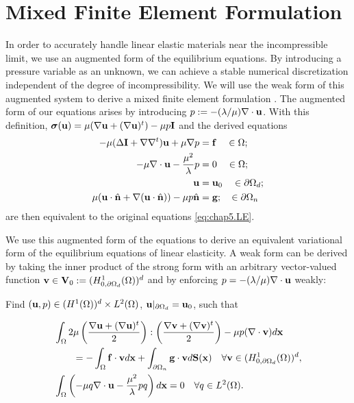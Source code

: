 \section{Mixed Finite Element Formulation} \label{sec:chap5.mixedfem}

In order to accurately handle linear elastic materials near the incompressible limit, we use an augmented form of the equilibrium equations. By introducing a pressure variable as an unknown, we can achieve a stable numerical discretization independent of the degree of incompressibility. We will use the weak form of this augmented system to derive a mixed finite element formulation \cite{Brezzi91}. The augmented form of our equations arises by introducing $p := -(\lambda/\mu) \nabla \cdot \mathbf{u}$. With this definition, $\boldsymbol{\sigma}(\mathbf{u}) = \mu (\nabla \mathbf{u} + (\nabla \mathbf{u})^t) - \mu p \mathbf{I}$ and the derived equations
\begin{subequations} \label{eq:chap5.augmented.strong}
\begin{align}
-\mu (\Delta \mathbf{I} + \nabla \nabla^t) \mathbf{u} + \mu \nabla p & = \mathbf{f} \quad \in \Omega; \label{eq:chap5.augmented.strong.PDE} \\
-\mu \nabla \cdot \mathbf{u} - \frac{\mu^2}{\lambda} p & = 0 \quad \in \Omega; \\
\mathbf{u} & = \mathbf{u}_0 \quad \in \partial\Omega_d; \\
\mu (\mathbf{u} \cdot \hat{\mathbf{n}} + \nabla (\mathbf{u} \cdot \hat{\mathbf{n}})) - \mu p \hat{\mathbf{n}} & = \mathbf{g}; \quad \in \partial\Omega_n
\end{align}
\end{subequations}
are then equivalent to the original equations \eqref{eq:chap5.LE}.

We use this augmented form of the equations to derive an equivalent variational form of the equilibrium equations of linear elasticity. A weak form can be derived by taking the inner product of the strong form with an arbitrary vector-valued function $\mathbf{v} \in \mathbf{V}_0 := (H_{0,\partial\Omega_d}^1(\Omega))^d$ and by enforcing $p = -(\lambda/\mu) \nabla \cdot \mathbf{u}$ weakly:
\begin{center}
Find $(\mathbf{u},p) \in (H^1(\Omega))^d \times L^2(\Omega)$, $\mathbf{u} \rvert_{\partial\Omega_d} = \mathbf{u}_0$, such that
\end{center}
\begin{subequations} \label{eq:chap5.augmented.weak}
\begin{align}
& \int_{\Omega} 2 \mu \left( \frac{\nabla \mathbf{u} + (\nabla \mathbf{u})^t}{2} \right) : \left( \frac{\nabla \mathbf{v} + (\nabla \mathbf{v})^t}{2} \right) - \mu p (\nabla \cdot \mathbf{v}) d\mathbf{x} \\
& \qquad = -\int_{\Omega} \mathbf{f} \cdot \mathbf{v} d\mathbf{x} + \int_{\partial\Omega_n} \mathbf{g} \cdot \mathbf{v} d\mathbf{S}(\mathbf{x}) \quad \forall \mathbf{v} \in (H^1_{0,\partial\Omega_d}(\Omega))^d, \\
& \int_{\Omega} \left( -\mu q \nabla \cdot \mathbf{u} - \frac{\mu^2}{\lambda} p q \right) d\mathbf{x} = 0 \quad \forall q \in L^2(\Omega).
\end{align}
\end{subequations}

